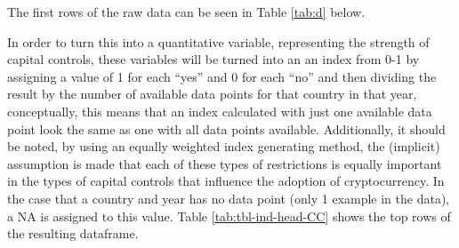 \documentclass[
]{article}
\begin{document}
The first rows of the raw data can be seen in Table \ref{tab:d} below.

\begin{table}[H]
\centering
\caption{\label{tab:d}IMF (2024) Capital Controls Dummy Data}
\centering
{}
\end{table}

In order to turn this into a quantitative variable, representing the strength of capital controls, these variables will be turned into an an index from 0-1 by assigning a value of 1 for each ``yes'' and 0 for each ``no'' and then dividing the result by the number of available data points for that country in that year, conceptually, this means that an index calculated with just one available data point look the same as one with all data points available. Additionally, it should be noted, by using an equally weighted index generating method, the (implicit) assumption is made that each of these types of restrictions is equally important in the types of capital controls that influence the adoption of cryptocurrency. In the case that a country and year has no data point (only 1 example in the data), a NA is assigned to this value. Table \ref{tab:tbl-ind-head-CC} shows the top rows of the resulting dataframe.
\end{document}
